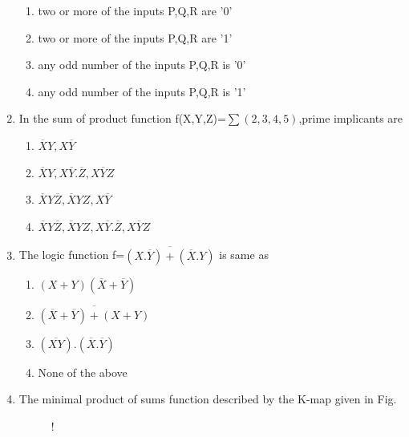 \documentclass[journal,12pt,twocolumn]{IEEEtran}
\begin{document}
\begin{enumerate}
   \begin{enumerate}
      \item two or more of the inputs P,Q,R are '0'
      \item two or more of the inputs P,Q,R are '1'
      \item any odd number of the inputs P,Q,R is '0'
      \item any odd number of the inputs P,Q,R is '1'
    \end{enumerate} 
    \item In the sum of product function f(X,Y,Z)=$\sum(2,3,4,5)$,prime implicants are
    \begin{enumerate}
      \item $\overline{X}Y,X\overline{Y}$
      \item $\overline{X}Y,X\overline{Y}.\overline{Z},X\overline{Y}Z$
      \item $\overline{X}Y\overline{Z},\overline{X}YZ,X\overline{Y}$
      \item $\overline{X}Y\overline{Z},\overline{X}YZ,X\overline{Y}.\overline{Z},X\overline{Y}Z$
    \end{enumerate}
    \item The logic function f=$\overline{(X.\overline{Y})+(\overline{X}.Y)}$ is same as
    \begin{enumerate}
      \item $(X+Y)(\overline{X}+\overline{Y})$
      \item $\overline{(\overline{X}+\overline{Y})+(X+Y)}$
      \item $(\overline{XY}).(\overline{X}.\overline{Y})$
      \item None of the above
    \end{enumerate}
    \item The minimal product of sums function described by the K-map given in Fig.
\begin{figure}[!h]
\centering
\resizebox {\columnwidth} {!} {

}
\end{figure}

%
  

\end{enumerate}
\end{document}

